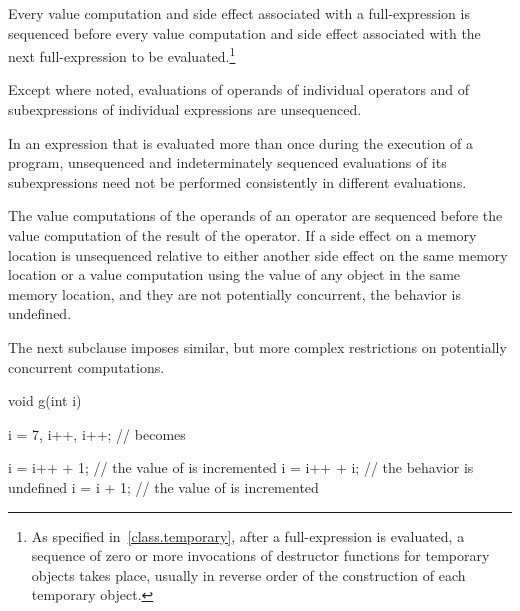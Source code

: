 \pnum
Every
%
value computation and
%
side effect associated with a full-expression is
sequenced before every value computation and side effect associated with the
next full-expression to be evaluated.\footnote{As specified
in~\ref{class.temporary}, after a full-expression is evaluated, a sequence of
zero or more invocations of destructor functions for temporary objects takes
place, usually in reverse order of the construction of each temporary object.}

\pnum
{}%
Except where noted, evaluations of operands of individual operators and
of subexpressions of individual expressions are unsequenced. \begin{note}
In an expression that is evaluated more than once during the execution
of a program, unsequenced and indeterminately sequenced evaluations of
its subexpressions need not be performed consistently in different
evaluations. \end{note} The value computations of the operands of an
operator are sequenced before the value computation of the result of the
operator. If a
%
side effect on a memory location is unsequenced
relative to either another side effect on the same memory location or
a value computation using the value of any object in the same memory location,
and they are not potentially concurrent,
the behavior is undefined.
\begin{note}
The next subclause imposes similar, but more complex restrictions on
potentially concurrent computations.
\end{note}

\begin{example}

\begin{codeblock}
void g(int i) {
  i = 7, i++, i++;              //  becomes 

  i = i++ + 1;                  // the value of  is incremented
  i = i++ + i;                  // the behavior is undefined
  i = i + 1;                    // the value of  is incremented
}
\end{codeblock}
\end{example}

